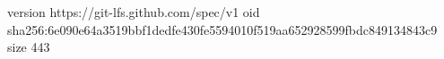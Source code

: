 version https://git-lfs.github.com/spec/v1
oid sha256:6e090e64a3519bbf1dedfe430fe5594010f519aa652928599fbdc849134843c9
size 443
